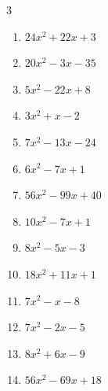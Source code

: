 \begin{multicols}{3}
\begin{enumerate}
  \item $24x^{2}+22x+3$

        \phantom{$=(6x+1)(4x+3)$}

  \item $20x^{2}-3x-35$

        \phantom{$=(5x-7)(4x+5)$}

  \item $5x^{2}-22x+8$

        \phantom{$=(5x-2)(x-4)$}

\columnbreak %

  \item $3x^{2}+x-2$

        \phantom{$=(3x-2)(x+1)$}

  \item $7x^{2}-13x-24$

        \phantom{$=(7x+8)(x-3)$}

  \item $6x^{2}-7x+1$

        \phantom{$=(6x-1)(x-1)$}

  \item $56x^{2}-99x+40$

        \phantom{$=(8x-5)(7x-8)$}

  \item $10x^{2}-7x+1$

        \phantom{$=(2x-1)(5x-1)$}

  \item $8x^{2}-5x-3$

        \phantom{$=(8x+3)(x-1)$}

  \item $18x^{2}+11x+1$

        \phantom{$=(9x+1)(2x+1)$}

  \item $7x^{2}-x-8$

        \phantom{$=(x+1)(7x-8)$}

  \item $7x^{2}-2x-5$

        \phantom{$=(x-1)(7x+5)$}

  \item $8x^{2}+6x-9$

        \phantom{$=(4x-3)(2x+3)$}

\columnbreak %

\resetques

  \item $56x^{2}-69x+18$

        \phantom{$=(7x-6)(8x-3)$}


\end{enumerate}
\end{multicols}
